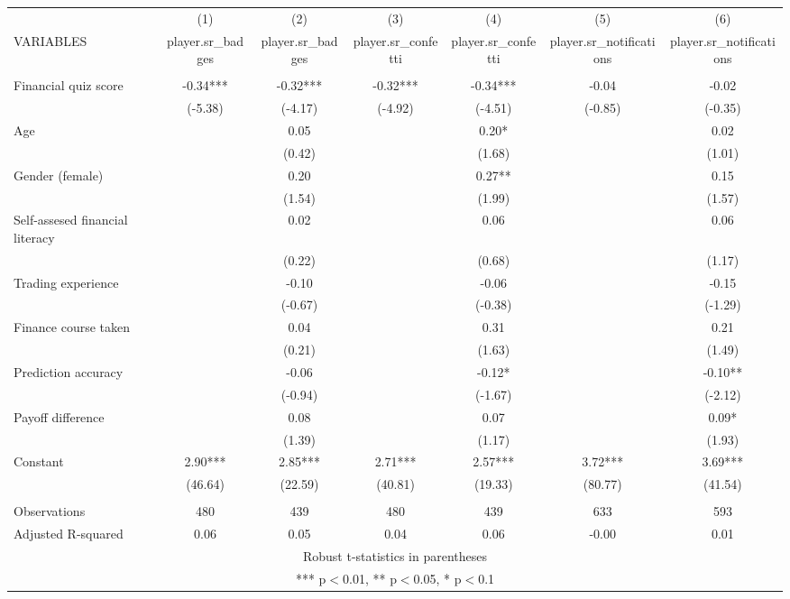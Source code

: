 \documentclass[]{article}
\begin{document}
\begin{tabular}{lcccccc} \hline
 & (1) & (2) & (3) & (4) & (5) & (6) \\
VARIABLES & player.sr\_badges & player.sr\_badges & player.sr\_confetti & player.sr\_confetti & player.sr\_notifications & player.sr\_notifications \\ \hline
 &  &  &  &  &  &  \\
Financial quiz score & -0.34*** & -0.32*** & -0.32*** & -0.34*** & -0.04 & -0.02 \\
 & (-5.38) & (-4.17) & (-4.92) & (-4.51) & (-0.85) & (-0.35) \\
Age &  & 0.05 &  & 0.20* &  & 0.02 \\
 &  & (0.42) &  & (1.68) &  & (1.01) \\
Gender (female) &  & 0.20 &  & 0.27** &  & 0.15 \\
 &  & (1.54) &  & (1.99) &  & (1.57) \\
Self-assesed financial literacy &  & 0.02 &  & 0.06 &  & 0.06 \\
 &  & (0.22) &  & (0.68) &  & (1.17) \\
Trading experience &  & -0.10 &  & -0.06 &  & -0.15 \\
 &  & (-0.67) &  & (-0.38) &  & (-1.29) \\
Finance course taken &  & 0.04 &  & 0.31 &  & 0.21 \\
 &  & (0.21) &  & (1.63) &  & (1.49) \\
Prediction accuracy &  & -0.06 &  & -0.12* &  & -0.10** \\
 &  & (-0.94) &  & (-1.67) &  & (-2.12) \\
Payoff difference &  & 0.08 &  & 0.07 &  & 0.09* \\
 &  & (1.39) &  & (1.17) &  & (1.93) \\
Constant & 2.90*** & 2.85*** & 2.71*** & 2.57*** & 3.72*** & 3.69*** \\
 & (46.64) & (22.59) & (40.81) & (19.33) & (80.77) & (41.54) \\
 &  &  &  &  &  &  \\
Observations & 480 & 439 & 480 & 439 & 633 & 593 \\
 Adjusted R-squared & 0.06 & 0.05 & 0.04 & 0.06 & -0.00 & 0.01 \\ \hline
\multicolumn{7}{c}{ Robust t-statistics in parentheses} \\
\multicolumn{7}{c}{ *** p$<$0.01, ** p$<$0.05, * p$<$0.1} \\
\end{tabular}
\end{document}
